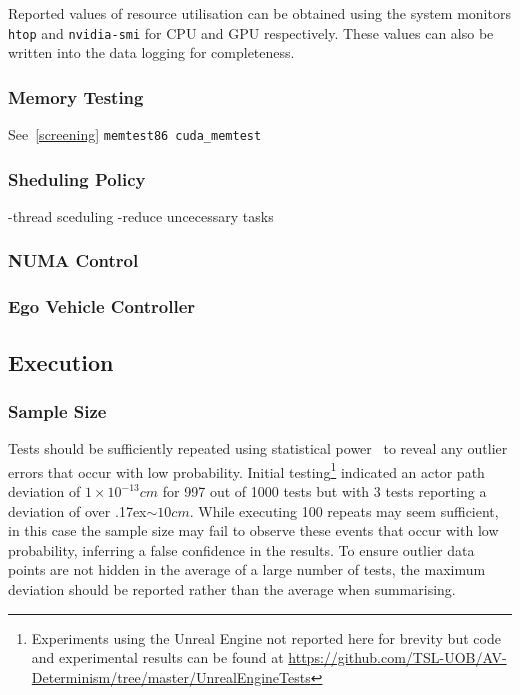 \documentclass[letterpaper, 10 pt, journal, twoside]{IEEEtran}
\begin{document}
Reported values of resource utilisation can be obtained using the system monitors \texttt{htop} and \texttt{nvidia-smi} for CPU and GPU respectively. These values can also be written into the data logging for completeness.



\subsubsection{Memory Testing}

See~\ref{screening}
\texttt{memtest86}\
\texttt{cuda\_memtest}


\subsubsection{Sheduling Policy}
-thread sceduling
-reduce uncecessary tasks


\subsubsection{NUMA Control}


\subsubsection{Ego Vehicle Controller}





\subsection{Execution}

\subsubsection{Sample Size}

Tests should be sufficiently repeated using statistical power~\cite{cohen2013statistical} to reveal any outlier errors that occur with low probability. Initial testing\footnote{\label{note1}Experiments using the Unreal Engine not reported here for brevity but code and experimental results can be found at \url{https://github.com/TSL-UOB/AV-Determinism/tree/master/UnrealEngineTests}} indicated an actor path deviation of $1\times10^{-13} cm$ for 997 out of 1000 tests but with 3 tests reporting a deviation of over {\raise.17ex\hbox{$\scriptstyle\sim$}}$10cm$. While executing 100 repeats may seem sufficient, in this case the sample size may fail to observe these events that occur with low probability, inferring a false confidence in the results. To ensure outlier data points are not hidden in the average of a large number of tests, the maximum deviation should be reported rather than the average when summarising.
\end{document}
